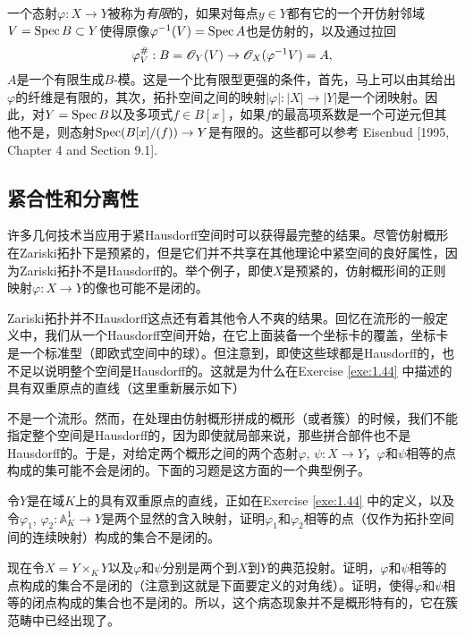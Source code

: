 一个态射$\varphi:X\to Y$被称为\textit{有限}的，如果对每点$y\in Y$都有它的一个开仿射邻域$V=\operatorname{Spec} B\subset Y$使得原像$\varphi^{-1}(V)=\operatorname{Spec} A$也是仿射的，以及通过拉回
\[
	\varphi_V^\#: B =\mathscr{O}_Y(V)\to \mathscr{O}_X(\varphi^{-1}V)=A,
\]
$A$是一个有限生成$B$-模。这是一个比有限型更强的条件，首先，马上可以由其给出$\varphi$的纤维是有限的，其次，拓扑空间之间的映射$|\varphi|:|X|\to |Y|$是一个闭映射。因此，对$Y=\operatorname{Spec} B$以及多项式$f\in B[x]$，如果$f$的最高项系数是一个可逆元但其他不是，则态射$\operatorname{Spec}(B[x]/(f))\to Y$是有限的。这些都可以参考 Eisenbud [1995, Chapter 4 and Section 9.1].

\subsection{紧合性和分离性}\label{s:3.1.2}

许多几何技术当应用于紧Hausdorff空间时可以获得最完整的结果。尽管仿射概形在Zariski拓扑下是预紧的，但是它们并不共享在其他理论中紧空间的良好属性，因为Zariski拓扑不是Hausdorff的。举个例子，即使$X$是预紧的，仿射概形间的正则映射$\varphi:X\to Y$的像也可能不是闭的。

Zariski拓扑并不Hausdorff这点还有着其他令人不爽的结果。回忆在流形的一般定义中，我们从一个Hausdorff空间开始，在它上面装备一个坐标卡的覆盖，坐标卡是一个标准型（即欧式空间中的球）。但注意到，即使这些球都是Hausdorff的，也不足以说明整个空间是Hausdorff的。这就是为什么在Exercise \ref{exe:1.44} 中描述的具有双重原点的直线（这里重新展示如下）


\vspace{-0.4em}\noindent 不是一个流形。然而，在处理由仿射概形拼成的概形（或者簇）的时候，我们不能指定整个空间是Hausdorff的，因为即使就局部来说，那些拼合部件也不是Hausdorff的。于是，对给定两个概形之间的两个态射$\varphi$, $\psi:X\to Y$，$\varphi$和$\psi$相等的点构成的集可能不会是闭的。下面的习题是这方面的一个典型例子。

\begin{exe}
\begin{compactenum}[(a)]
\item 令$Y$是在域$K$上的具有双重原点的直线，正如在Exercise \ref{exe:1.44} 中的定义，以及令$\varphi_1$, $\varphi_2:\mathbb{A}_K^1\to Y$是两个显然的含入映射，证明$\varphi_1$和$\varphi_2$相等的点（仅作为拓扑空间间的连续映射）构成的集合不是闭的。
\item 现在令$X=Y\times_K Y$以及$\varphi$和$\psi$分别是两个到$X$到$Y$的典范投射。证明，$\varphi$和$\psi$相等的点构成的集合不是闭的（注意到这就是下面要定义的对角线）。证明，使得$\varphi$和$\psi$相等的闭点构成的集合也不是闭的。所以，这个病态现象并不是概形特有的，它在簇范畴中已经出现了。
\end{compactenum}
\end{exe}

